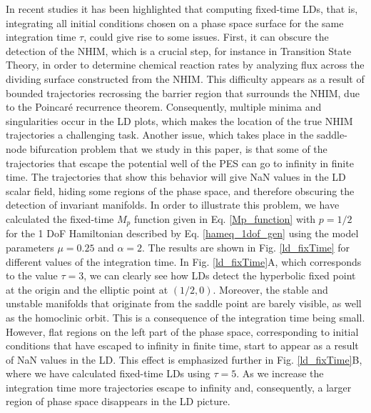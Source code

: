 \documentclass{ws-ijbc}
\begin{document}
In recent studies\cite{junginger2017chemical,Naik2019b} it has been highlighted that computing fixed-time LDs, that is, integrating all initial conditions chosen on a phase space surface for the same integration time $\tau$, could give rise to some issues. First, it can obscure the detection of the NHIM, which is a crucial step, for instance in Transition State Theory, in order to determine chemical reaction rates by analyzing flux across the dividing surface constructed from the NHIM. This difficulty appears as a result of bounded trajectories  recrossing the barrier region that surrounds the NHIM, due to the Poincar\'e recurrence theorem. Consequently, multiple minima and singularities occur in the LD plots, which makes the location of the true NHIM trajectories a challenging task. Another issue, which takes place in the saddle-node bifurcation problem that we study in this paper, is that some of the trajectories that escape the potential well of the PES can go to infinity in finite time. The trajectories that show this behavior will give NaN values in the LD scalar field, hiding some regions of the phase space, and therefore obscuring the detection of invariant manifolds. In order to illustrate this problem, we have calculated the fixed-time $M_p$ function given in Eq. \eqref{Mp_function} with $p = 1/2$ for the 1 DoF Hamiltonian described by Eq. \eqref{hameq_1dof_gen} using the model parameters $\mu = 0.25$ and $\alpha = 2$. The results are shown in Fig. \ref{ld_fixTime} for different values of the integration time. In Fig. \ref{ld_fixTime}A, which corresponds to the value $\tau = 3$, we can clearly see how LDs detect the hyperbolic fixed point at the origin and the elliptic point at $(1/2,0)$. Moreover, the stable and unstable manifolds that originate from the saddle point are barely visible, as well as the homoclinic orbit. This is a consequence of the integration time being small. However, flat regions on the left part of the phase space, corresponding to initial conditions that have escaped to infinity in finite time, start to appear as a result of NaN values in the LD. This effect is emphasized further in Fig. \ref{ld_fixTime}B, where we have calculated fixed-time LDs using $\tau = 5$. As we increase the integration time more trajectories escape to infinity and, consequently, a larger region of phase space disappears in the LD picture.
\end{document}
